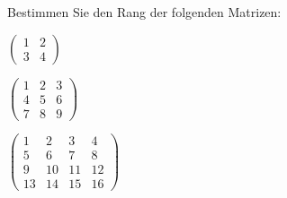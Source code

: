 Bestimmen Sie den Rang der folgenden Matrizen:
\begin{teilaufgaben}
\item $\begin{pmatrix}1&2\\3&4\end{pmatrix}$
\item $\begin{pmatrix}1&2&3\\4&5&6\\7&8&9\end{pmatrix}$
\item $\begin{pmatrix}1&2&3&4\\5&6&7&8\\9&10&11&12\\13&14&15&16\end{pmatrix}$
\end{teilaufgaben}


